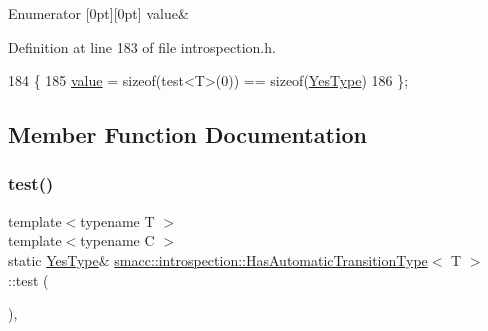 \begin{DoxyEnumFields}{Enumerator}
[0pt][0pt]{}\mbox{\label{classsmacc_1_1introspection_1_1HasAutomaticTransitionType_ac663d77745eac0f2b2ceb29e4c8b300ba8aba42189dc17891761a49375684776d}} 
value&\\
\hline

\end{DoxyEnumFields}


Definition at line 183 of file introspection.\+h.


\begin{DoxyCode}
184     \{
185         \hyperlink{classsmacc_1_1introspection_1_1HasAutomaticTransitionType_ac663d77745eac0f2b2ceb29e4c8b300ba8aba42189dc17891761a49375684776d}{value} = \textcolor{keyword}{sizeof}(test<T>(0)) == \textcolor{keyword}{sizeof}(\hyperlink{classsmacc_1_1introspection_1_1HasAutomaticTransitionType_abeb599df547eb3db36684b6cb343eade}{YesType})
186     \};
\end{DoxyCode}


\subsection{Member Function Documentation}
\mbox{\label{classsmacc_1_1introspection_1_1HasAutomaticTransitionType_a3521b68e2adb57520d3ca8cfbea082fb}} 
\subsubsection{\texorpdfstring{test()}{test()}\hspace{0.1cm}{\footnotesize\ttfamily [1/2]}}
{\footnotesize\ttfamily template$<$typename T $>$ \\
template$<$typename C $>$ \\
static \hyperlink{classsmacc_1_1introspection_1_1HasAutomaticTransitionType_abeb599df547eb3db36684b6cb343eade}{Yes\+Type}\& \hyperlink{classsmacc_1_1introspection_1_1HasAutomaticTransitionType}{smacc\+::introspection\+::\+Has\+Automatic\+Transition\+Type}$<$ T $>$\+::test (\begin{DoxyParamCaption}\item[{decltype \&\+::get\+Default\+Transition\+Type}]{ }\end{DoxyParamCaption})\hspace{0.3cm}{\ttfamily [static]}, {\ttfamily [private]}}


